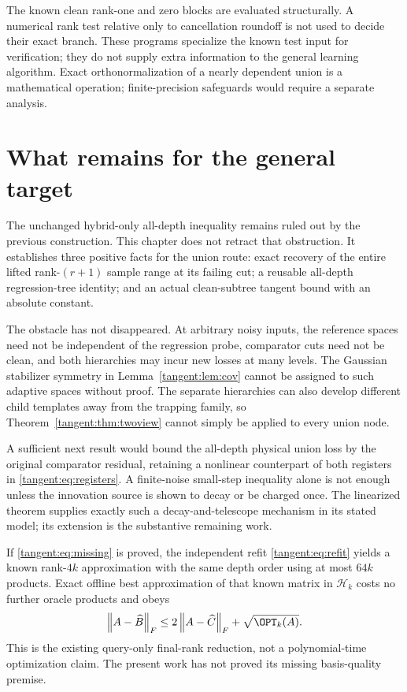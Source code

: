 \documentclass[11pt,oneside,openany,a4paper]{book}
\numberwithin{equation}{chapter}
\theoremstyle{definition}
\theoremstyle{remark}
\newcommand{\F}[1]{\left\lVert#1\right\rVert_F}
\newcommand{\HH}{\mathcal H}\newcommand{\SSS}{\mathcal S}
\begin{document}
The known clean rank-one and zero blocks are evaluated structurally. A numerical rank test relative only to cancellation roundoff is not used to decide their exact branch. These programs specialize the known test input for verification; they do not supply extra information to the general learning algorithm. Exact orthonormalization of a nearly dependent union is a mathematical operation; finite-precision safeguards would require a separate analysis.

\section{What remains for the general target}
The unchanged hybrid-only all-depth inequality remains ruled out by the previous construction. This chapter does not retract that obstruction. It establishes three positive facts for the union route: exact recovery of the entire lifted rank-$(r+1)$ sample range at its failing cut; a reusable all-depth regression-tree identity; and an actual clean-subtree tangent bound with an absolute constant.

The obstacle has not disappeared. At arbitrary noisy inputs, the reference spaces need not be independent of the regression probe, comparator cuts need not be clean, and both hierarchies may incur new losses at many levels. The Gaussian stabilizer symmetry in Lemma~\ref{tangent:lem:cov} cannot be assigned to such adaptive spaces without proof. The separate hierarchies can also develop different child templates away from the trapping family, so Theorem~\ref{tangent:thm:twoview} cannot simply be applied to every union node.

A sufficient next result would bound the all-depth physical union loss by the original comparator residual, retaining a nonlinear counterpart of both registers in \eqref{tangent:eq:registers}. A finite-noise small-step inequality alone is not enough unless the innovation source is shown to decay or be charged once. The linearized theorem supplies exactly such a decay-and-telescope mechanism in its stated model; its extension is the substantive remaining work.

If \eqref{tangent:eq:missing} is proved, the independent refit \eqref{tangent:eq:refit} yields a known rank-$4k$ approximation with the same depth order using at most $64k$ products. Exact offline best approximation of that known matrix in $\HH_k$ costs no further oracle products and obeys
\[
 \F{A-\widehat B}\le2\F{A-\widehat C}+\sqrt{\OPT_k(A)}.
\]
This is the existing query-only final-rank reduction, not a polynomial-time optimization claim. The present work has not proved its missing basis-quality premise.
\end{document}
